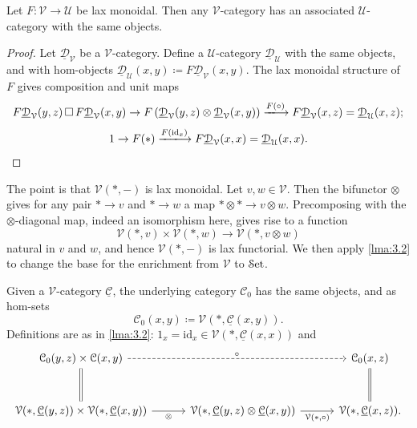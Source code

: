 \begin{lemma}\label{lma:3.2}
	Let $F : \mathcal{V}  \to \mathcal{U} $ be lax monoidal. Then any $\mathcal{V} $-category has an associated $\mathcal{U} $-category with the same objects.
\end{lemma}
\begin{proof}
	Let $\underline{\mathcal{D} }_\mathcal{V} $ be a $\mathcal{V} $-category. Define a $\mathcal{U} $-category $\underline{\mathcal{D} } _\mathcal{U} $ with the same objects, and with hom-objects $\underline{\mathcal{D} } _\mathcal{U}(x,y) \coloneqq F\underline{\mathcal{D} } _\mathcal{V} (x,y)$. The lax monoidal structure of $F$ gives composition and unit maps
	\[
		F\underline{\mathcal{D} } _\mathcal{V} (y,z)\,\Box\, F\underline{\mathcal{D} } _\mathcal{V} (x,y)\to F\left( \underline{\mathcal{D} } _\mathcal{V} (y,z)\otimes \underline{\mathcal{D} }_\mathcal{V} (x,y) \right) \xlongrightarrow{F(\circ )}F\underline{\mathcal{D} } _\mathcal{V} (x,z)=\underline{\mathcal{D} } _\mathcal{U} (x,z);
	\]
	\[
		1\to F(*)\xlongrightarrow{F(\mathrm{id}_x)} F\underline{\mathcal{D} } _\mathcal{V} (x,x)=\underline{\mathcal{D} } _\mathcal{U} (x,x)
	.\]
\end{proof}

The point is that $\mathcal{V} (*,-)$ is lax monoidal. Let $v,w\in \mathcal{V} $. Then the bifunctor $\otimes $ gives for any pair $*\to v$ and $*\to w$ a map $*\otimes * \to v\otimes w$. Precomposing with the $\otimes $-diagonal map, indeed an isomorphism here, gives rise to a function
\[
	\mathcal{V} (*,v)\times \mathcal{V} (*,w)\to \mathcal{V} (*,v\otimes w)
\]
natural in $v$ and $w$, and hence $\mathcal{V} (*,-)$ is lax functorial. We then apply \cref{lma:3.2} to change the base for the enrichment from $\mathcal{V} $ to $\mathcal{S}\mathrm{et} $.

\begin{definition}\label{dfn:3.4}
	Given a $\mathcal{V} $-category $\underline{\mathcal{C} } $, the underlying category $\mathcal{C} _0$ has the same objects, and as hom-sets
	\[
		\mathcal{C} _0(x,y)\coloneqq \mathcal{V} (*,\underline{\mathcal{C} } (x,y))
	.\]
	Definitions are as in \cref{lma:3.2}: $1_x=\mathrm{id} _x\in \mathcal{V} (*,\underline{\mathcal{C} } (x,x))$ and
	\[\begin{tikzcd}[row sep = 3em, column sep = 3em]
	\mathcal{C} _0(y,z)\times \mathcal{C} (x,y)\ar[" \circ  ", dashed, rr] \ar[equals, d]  &  & \mathcal{C} _0(x,z)\ar[equals, d]  \\
	\mathcal{V} (*,\underline{\mathcal{C} } (y,z))\times \mathcal{V} (*,\underline{\mathcal{C} } (x,y))\ar[" \otimes  "', r]  & \mathcal{V} (*,\underline{\mathcal{C} } (y,z)\otimes \underline{\mathcal{C} } (x,y))\ar[" \mathcal{V} (*\text{,} \circ ) "', r]  & \mathcal{V} (*,\underline{\mathcal{C} } (x,z)).
	\end{tikzcd}\]
\end{definition}

